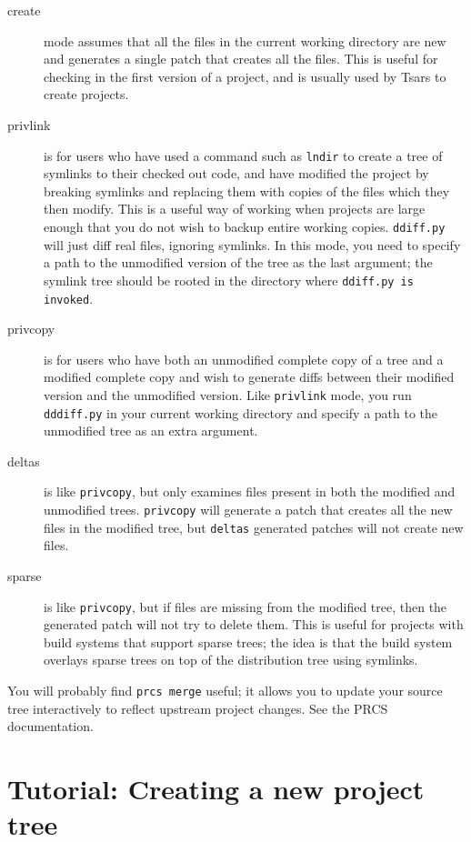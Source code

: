\documentclass{article}
\begin{document}
\begin{description}
\item[create] mode assumes that all the files in the current working
directory are new and generates a single patch that creates all the
files. This is useful for checking in the first version of a project,
and is usually used by Tsars to create projects.

\item[privlink] is for users who have used a command such as
\texttt{lndir} to create a tree of symlinks to their checked out code,
and have modified the project by breaking symlinks and replacing them
with copies of the files which they then modify. This is a useful way
of working when projects are large enough that you do not wish to
backup entire working copies. \texttt{ddiff.py} will just diff real
files, ignoring symlinks. In this mode, you need to specify a path to
the unmodified version of the tree as the last argument; the symlink
tree should be rooted in the directory where \texttt{ddiff.py is invoked}.

\item[privcopy] is for users who have both an unmodified complete copy
of a tree and a modified complete copy and wish to generate diffs
between their modified version and the unmodified version. Like
\texttt{privlink} mode, you run \texttt{dddiff.py} in your current
working directory and specify a path to the unmodified tree as an
extra argument.

\item[deltas] is like \texttt{privcopy}, but only examines files
present in both the modified and unmodified trees. \texttt{privcopy}
will generate a patch that creates all the new files in the modified
tree, but \texttt{deltas} generated patches will not create new files.

\item[sparse] is like \texttt{privcopy}, but if files are missing from
the modified tree, then the generated patch will not try to delete
them. This is useful for projects with build systems that support
sparse trees; the idea is that the build system overlays sparse trees
on top of the distribution tree using symlinks. 
\end{description}

You will probably find \texttt{prcs merge} useful; it allows you to
update your source tree interactively to reflect upstream project
changes. See the PRCS documentation.

\section{Tutorial: Creating a new project tree}
\end{document}

